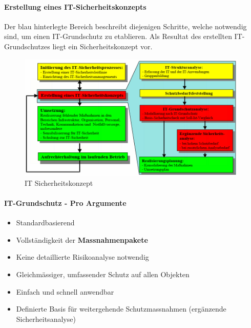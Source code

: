 \documentclass[10pt,a4paper]{article}
\begin{document}
\paragraph*{Erstellung eines IT-Sicherheitskonzepts} Der blau hinterlegte Bereich beschreibt diejenigen Schritte, welche notwendig sind, um einen IT-Grundschutz zu etablieren. Als Resultat des erstellten IT-Grundschutzes liegt ein Sicherheitskonzept vor.
\begin{figure}[H]
    \begin{center}
    \includegraphics[width=11cm]{images/IT_Sicherheitskonzept.png}
    \caption{IT Sicherheitskonzept}
    \label{IT Sicherheitskonzept}
    \end{center}
\end{figure}

\paragraph*{IT-Grundschutz - Pro Argumente}
\begin{itemize}[noitemsep,topsep=0pt,leftmargin=*]
    \item Standardbasierend
    \item Vollständigkeit der \textbf{Massnahmenpakete}
    \item Keine detaillierte Risikoanalyse notwendig
    \item Gleichmässiger, umfassender Schutz auf
    allen Objekten
    \item Einfach und schnell anwendbar
    \item Definierte Basis für weitergehende
    Schutzmassnahmen (ergänzende
    Sicherheitsanalyse)
\end{itemize}
\end{document}
